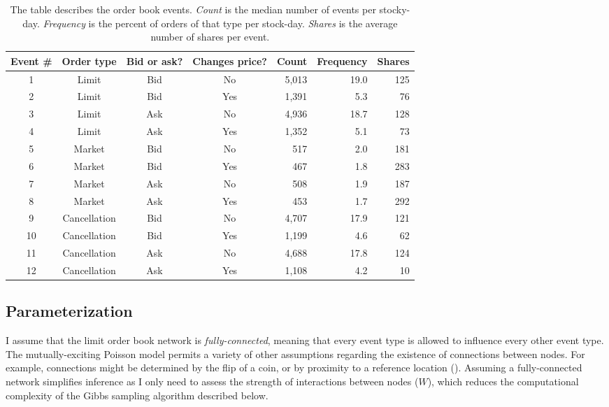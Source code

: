 		\begin{table}[t]
			\small
			\linespread{1}
			\centering
			\begin{tabular*}{\textwidth}{@{\extracolsep{\fill}}ccccrrr}
			\toprule
			Event \# & Order type & Bid or ask? & Changes price? & Count & Frequency & Shares \\
			\midrule
			1 & Limit & Bid & No & 5,013 & 19.0 & 125 \\
			2 & Limit & Bid & Yes & 1,391 & 5.3 & 76 \\
			3 & Limit & Ask & No & 4,936 & 18.7 & 128 \\
			4 & Limit & Ask & Yes & 1,352 & 5.1 & 73 \\  %
			5 & Market & Bid & No & 517 & 2.0 & 181 \\   %
			6 & Market & Bid & Yes & 467 & 1.8 & 283 \\  %
			7 & Market & Ask & No & 508 & 1.9 & 187 \\   %
			8 & Market & Ask & Yes & 453 & 1.7 & 292 \\
			9 & Cancellation & Bid & No & 4,707 & 17.9 & 121 \\
			10 & Cancellation & Bid & Yes & 1,199 & 4.6 & 62 \\
			11 & Cancellation & Ask & No & 4,688 & 17.8 & 124 \\
			12 & Cancellation & Ask & Yes & 1,108 & 4.2 & 10 \\
			\bottomrule
			\end{tabular*}
			\captionsetup{position=below, font=footnotesize, justification=justified, width=\linewidth}
			\caption[Order book event definitions]{The table describes the order book events. \textit{Count} is the median number of events per stocky-day. \textit{Frequency} is the percent of orders of that type per stock-day. \textit{Shares} is the average number of shares per event.}
			\label{tab:event_definitions}
		\end{table}

	\subsection{Parameterization}
		I assume that the limit order book network is \textit{fully-connected}, meaning that every event type is allowed to influence every other event type. The mutually-exciting Poisson model permits a variety of other assumptions regarding the existence of connections between nodes. For example, connections might be determined by the flip of a coin, or by proximity to a reference location (\cite{Linderman2015}). Assuming a fully-connected network simplifies inference as I only need to assess the strength of interactions between nodes ($W$), which reduces the computational complexity of the Gibbs sampling algorithm described below.

